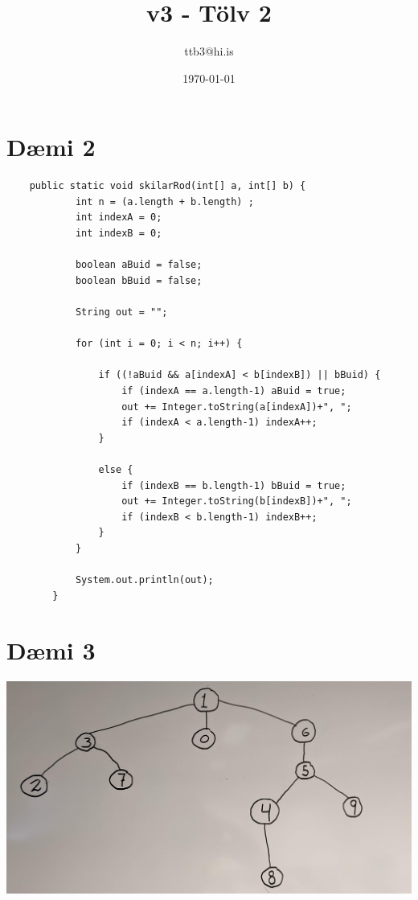 \documentclass{article}
\title{v3 - Tölv 2}
\author{ttb3@hi.is}
\date{\today}
\begin{document}
\maketitle


\section*{Dæmi 2}

\begin{lstlisting}
    public static void skilarRod(int[] a, int[] b) {
            int n = (a.length + b.length) ;
            int indexA = 0;
            int indexB = 0;
    
            boolean aBuid = false;
            boolean bBuid = false;
    
            String out = "";
    
            for (int i = 0; i < n; i++) {
                
                if ((!aBuid && a[indexA] < b[indexB]) || bBuid) {
                    if (indexA == a.length-1) aBuid = true;
                    out += Integer.toString(a[indexA])+", ";
                    if (indexA < a.length-1) indexA++;
                }
    
                else {
                    if (indexB == b.length-1) bBuid = true;
                    out += Integer.toString(b[indexB])+", ";
                    if (indexB < b.length-1) indexB++;
                }
            }
            
            System.out.println(out);
        }
\end{lstlisting}

\section*{Dæmi 3}
\begin{center}
    \includegraphics[scale=0.1]{imgs/tree_159.jpg}
\end{center}
\end{document}
